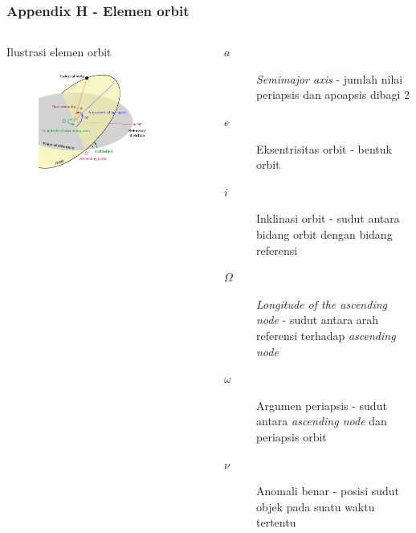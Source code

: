 \documentclass[8pt]{beamer}
\begin{document}
\begin{frame}
  \frametitle{Appendix H - Elemen orbit}
  \begin{columns}[T]
          \begin{block}{\center Ilustrasi elemen orbit}
      \begin{figure}
          \includegraphics[width=0.8\textwidth]{figure/elemenorbit.png}
      \end{figure}
          \end{block}
      \begin{description}
        \item[$a$] \textit{Semimajor axis} - jumlah nilai periapsis dan apoapsis dibagi 2
        \item[$e$] Eksentrisitas orbit - bentuk orbit
        \item[$i$] Inklinasi orbit - sudut antara bidang orbit dengan bidang referensi
        \item[$\Omega$] \textit{Longitude of the ascending node} - sudut antara arah referensi terhadap \textit{ascending node}
        \item[$\omega$] Argumen periapsis - sudut antara \textit{ascending node} dan periapsis orbit
        \item[$\nu$] Anomali benar - posisi sudut objek pada suatu waktu tertentu
\end{description}
  \end{columns}
\end{frame}
\end{document}
